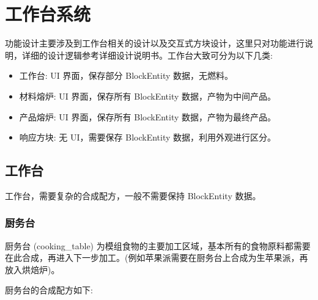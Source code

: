 \section{工作台系统}

功能设计主要涉及到工作台相关的设计以及交互式方块设计，这里只对功能进行说明，详细的设计逻辑参考详细设计说明书。工作台大致可分为以下几类:
\begin{itemize}
    \item 工作台: UI 界面，保存部分 BlockEntity 数据，无燃料。
    \item 材料熔炉: UI 界面，保存所有 BlockEntity 数据，产物为中间产品。
    \item 产品熔炉: UI 界面，保存所有 BlockEntity 数据，产物为最终产品。
    \item 响应方块: 无 UI，需要保存 BlockEntity 数据，利用外观进行区分。
\end{itemize}

\subsection{工作台}

工作台，需要复杂的合成配方，一般不需要保持 BlockEntity 数据。

\subsubsection{厨务台}

厨务台 (cooking\_table) 为模组食物的主要加工区域，基本所有的食物原料都需要在此合成，再进入下一步加工。(例如苹果派需要在厨务台上合成为生苹果派，再放入烘焙炉)。

厨务台的合成配方如下:


